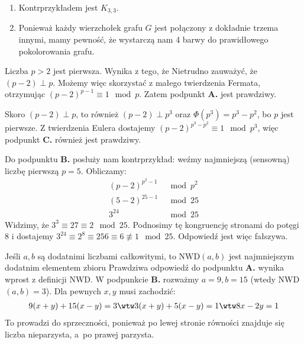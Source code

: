 \begin{solutions}
\begin{enumerate}[\bf A.]
        \item Kontrprzykładem jest $K_{3, 3}$.

        \item Ponieważ każdy wierzchołek grafu $G$ jest połączony z dokładnie trzema innymi, mamy pewność, że wystarczą nam 4 barwy do prawidłowego pokolorowania grafu. 
    \end{enumerate}

    \sol Liczba $p > 2$ jest pierwsza. Wynika z tego, że
    Nietrudno zauważyć, że $(p-2)\perp p$. Możemy więc skorzystać z małego twierdzenia Fermata, otrzymując ${(p-2)^{p-1}\equiv 1\mod{p}}$. Zatem podpunkt \textbf{A.} jest prawdziwy.
    
    Skoro $(p-2)\perp p$, to również $(p-2)\perp p^3$ oraz $\Phi(p^3)=p^3-p^2$, bo $p$ jest pierwsze. Z twierdzenia Eulera dostajemy $(p-2)^{p^3-p^2}\equiv 1\mod{p^3}$, więc podpunkt \textbf{C.} również jest prawdziwy.
    
    Do podpunktu \textbf{B.} posłuży nam kontrprzykład: weźmy najmniejszą (sensowną) liczbę pierwszą $p=5$. Obliczamy:
    \begin{align*}
        (p-2)^{p^2-1} &\mod p^2 \\
        (5-2)^{25-1} &\mod 25 \\
        3^{24} &\mod 25
    \end{align*}
    Widzimy, że $3^3\equiv 27\equiv 2\mod{25}$. Podnosimy tę kongruencję stronami do potęgi 8 i dostajemy $3^{24}\equiv 2^8\equiv 256\equiv 6\nequiv 1\mod{25}$. Odpowiedź jest więc fałszywa.

    \sol Jeśli $a, b$ są dodatnimi liczbami całkowitymi, to $\mathrm{NWD}(a,b)$ jest najmniejszym dodatnim elementem zbioru
    Prawdziwa odpowiedź do podpunktu \textbf{A.} wynika wprost z definicji NWD. W podpunkcie \textbf{B.} rozważmy $a = 9, b = 15$ (wtedy NWD$(a, b) = 3$). Dla pewnych $x, y$ musi zachodzić:
    \begin{align*}
        9(x + y) + 15(x - y) = 3 \wtw 3(x + y) + 5(x - y) = 1 \wtw 8x - 2y = 1
    \end{align*}
    To prowadzi do sprzeczności, ponieważ po lewej stronie równości znajduje się liczba nieparzysta, a~po prawej parzysta.
    

\end{solutions}
